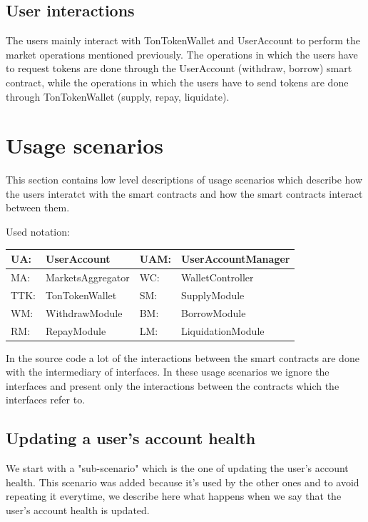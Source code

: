 \subsection{User interactions}

The users mainly interact with TonTokenWallet and UserAccount to perform the market operations mentioned previously. The operations in which the users have to request tokens are done through the UserAccount (withdraw, borrow) smart contract, while the operations in which the users have to send tokens are done through TonTokenWallet (supply, repay, liquidate).

\section{Usage scenarios}

This section contains low level descriptions of usage scenarios which describe how the users interatct with the smart contracts and how the smart contracts interact between them.

Used notation:

\begin{tabularx}{\textwidth}{|l X|l X|} \hline
  UA: & UserAccount &         UAM: & UserAccountManager \\\hline
  MA: & MarketsAggregator &   WC: & WalletController \\\hline
  TTK: & TonTokenWallet &     SM: & SupplyModule \\\hline
  WM: & WithdrawModule &      BM: & BorrowModule \\\hline
  RM: & RepayModule &         LM: & LiquidationModule \\\hline
\end{tabularx}

In the source code a lot of the interactions between the smart contracts are done with the intermediary of interfaces. In these usage scenarios we ignore the interfaces and present only the interactions between the contracts which the interfaces refer to.

\subsection{Updating a user's account health}
We start with a "sub-scenario" which is the one of updating the user's account health. This scenario was added because it's used by the other ones and to avoid repeating it everytime, we describe here what happens when we say that the user's account health is updated.

